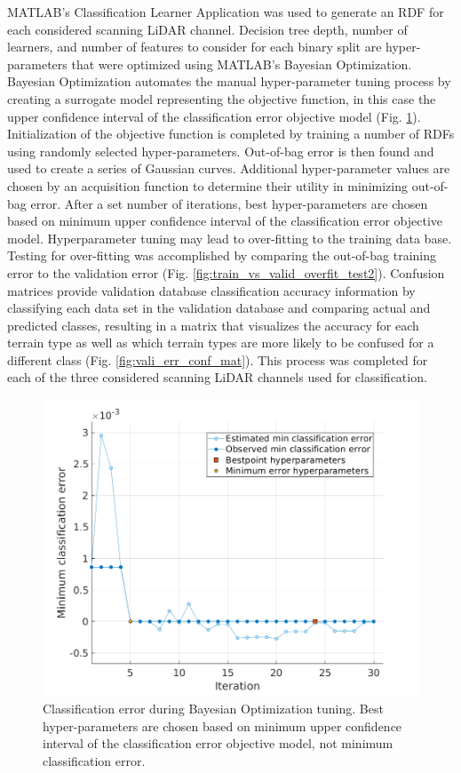 \documentclass[journal,onecolumn]{IEEEtran}
\begin{document}
			{MATLAB's Classification Learner Application was used to generate an RDF for each considered scanning LiDAR channel. Decision tree depth, number of learners, and number of features to consider for each binary split are hyper-parameters that were optimized using MATLAB's Bayesian Optimization. Bayesian Optimization automates the manual hyper-parameter tuning process by creating a surrogate model representing the objective function, in this case the upper confidence interval of the classification error objective model (Fig. \ref{fig:c2_min_class_error}). Initialization of the objective function is completed by training a number of RDFs using randomly selected hyper-parameters. Out-of-bag error is then found and used to create a series of Gaussian curves. Additional hyper-parameter values are chosen by an acquisition function to determine their utility in minimizing out-of-bag error. After a set number of iterations, best hyper-parameters are chosen based on minimum upper confidence interval of the classification error objective model. Hyperparameter tuning may lead to over-fitting to the training data base. Testing for over-fitting was accomplished by comparing the out-of-bag training error to the validation error (Fig. \ref{fig:train_vs_valid_overfit_test2}). Confusion matrices provide validation database classification accuracy information by classifying each data set in the validation database and comparing actual and predicted classes, resulting in a matrix that visualizes the accuracy for each terrain type as well as which terrain types are more likely to be confused for a different class (Fig. \ref{fig:vali_err_conf_mat}). This process was completed for each of the three considered scanning LiDAR channels used for classification.}
	
			\begin{figure}[H]
				\centering
				\includegraphics[width=0.75\linewidth]{figures/c2_min_class_error}
				\caption[RDF Training Classification Error]{Classification error during Bayesian Optimization tuning. Best hyper-parameters are chosen based on minimum upper confidence interval of the classification error objective model, not minimum classification error.}
				\label{fig:c2_min_class_error}
			\end{figure}
		
\end{document}
